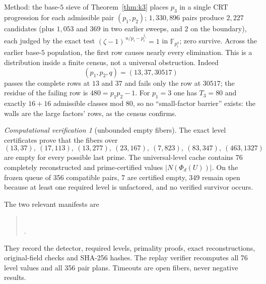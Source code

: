 \documentclass[11pt]{amsart}
\theoremstyle{definition}
\theoremstyle{remark}
\newtheorem{verification}[theorem]{Computational verification}
\newcommand{\F}{\mathbb{F}}
\begin{document}
Method: the base-$5$ sieve of Theorem~\ref{thm:k3} places $p_3$ in a single
CRT progression for each admissible pair $(p_1,p_2)$; $1{,}330{,}896$ pairs
produce $2{,}227$ candidates (plus $1{,}053$ and $369$ in two earlier
sweeps, and $2$ on the boundary), each judged by the exact test
$(\zeta-1)^{\,n/p_i - p_i^{j_i}} = 1$ in $\F_{p_i^4}$; zero survive. Across
the earlier base-$5$ population, the first row causes nearly every
elimination. This is a distribution inside a finite census, not a universal
obstruction. Indeed
\[
(p_1,p_2,q)=(13,37,30517)
\]
passes the complete rows at \(13\) and \(37\) and fails only the row at
\(30517\); the residue of the failing row is \(480=p_1p_2-1\).
For $p_1 = 3$ one has $T_3 = 80$ and exactly $16 + 16$ admissible classes
mod $80$, so no ``small-factor barrier'' exists: the walls are the large
factors' rows, as the census confirms.

\begin{verification}[unbounded empty fibers]\label{ver:emptyfibers}
The exact level certificates prove that the fibers over
\[
(13,37),\ (17,113),\ (13,277),\ (23,167),\ (7,823),\
(83,347),\ (463,1327)
\]
are empty for every possible last prime. The universal-level cache contains
76 completely reconstructed and prime-certified values
\(\lvert N(\Phi_d(U))\rvert\). On the frozen queue of 356 compatible pairs,
7 are certified empty, 349 remain open because at least one required level
is unfactored, and no verified survivor occurs.
\end{verification}

The two relevant manifests are
\begin{quote}\small
{}\\
.
\end{quote}
They record the detector, required levels, primality proofs, exact
reconstructions, original-field checks and SHA-256 hashes. The replay
verifier recomputes all 76 level values and all 356 pair plans. Timeouts are
open fibers, never negative results.
\end{document}
